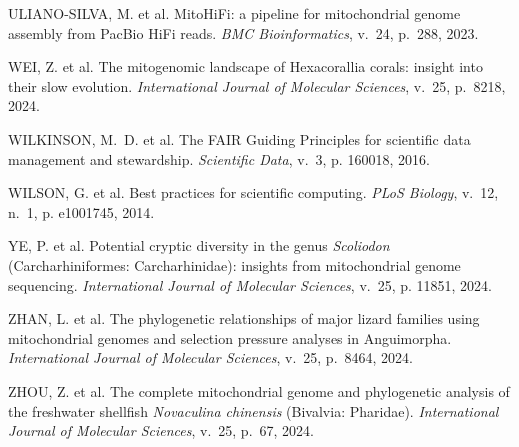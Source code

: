 \begin{thebibliography}{}
{ULIANO-SILVA, M. et al. {MitoHiFi}: a pipeline for mitochondrial genome
  assembly from {PacBio} {HiFi} reads.
\emph{BMC Bioinformatics}, v.~24, p.~288, 2023.}

{WEI, Z. et al. The mitogenomic landscape of {H}exacorallia corals: insight
  into their slow evolution.
\emph{International Journal of Molecular Sciences}, v.~25, p.~8218, 2024.}

{WILKINSON, M.~D. et al. The {FAIR} {G}uiding {P}rinciples for scientific data
  management and stewardship.
\emph{Scientific Data}, v.~3, p. 160018, 2016.}

{WILSON, G. et al. Best practices for scientific computing.
\emph{PLoS Biology}, v.~12, n.~1, p. e1001745, 2014.}

{YE, P. et al. Potential cryptic diversity in the genus \textit{Scoliodon}
  ({C}archarhiniformes: {C}archarhinidae): insights from mitochondrial genome
  sequencing.
\emph{International Journal of Molecular Sciences}, v.~25, p. 11851, 2024.}

{ZHAN, L. et al. The phylogenetic relationships of major lizard families using
  mitochondrial genomes and selection pressure analyses in {A}nguimorpha.
\emph{International Journal of Molecular Sciences}, v.~25, p.~8464, 2024.}

{ZHOU, Z. et al. The complete mitochondrial genome and phylogenetic analysis of
  the freshwater shellfish \textit{Novaculina chinensis} ({B}ivalvia:
  {P}haridae).
\emph{International Journal of Molecular Sciences}, v.~25, p.~67, 2024.}

\end{thebibliography}
